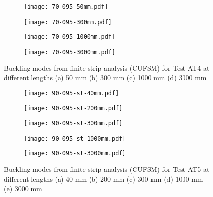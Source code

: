 \begin{figure}
	\centering
	\begin{subfigure}[b]{0.15\textwidth}
		\centering
		\texttt{[image: 70-095-50mm.pdf]}
		\caption{}
		\label{subfig:70-095-50mm}
	\end{subfigure}
	\begin{subfigure}[b]{0.15\textwidth}
		\centering
		\texttt{[image: 70-095-300mm.pdf]}
		\caption{}
		\label{subfig:70-095-300mm}
	\end{subfigure}
	\begin{subfigure}[b]{0.18\textwidth}
		\centering
		\texttt{[image: 70-095-1000mm.pdf]}
		\caption{}
		\label{subfig:70-095-1000mm}
	\end{subfigure}
	\begin{subfigure}[b]{0.18\textwidth}
		\centering
		\texttt{[image: 70-095-3000mm.pdf]}
		\caption{}
		\label{subfig:70-095-3000mm}
	\end{subfigure}
		\caption{Buckling modes from finite strip analysis (CUFSM) for Test-AT4 at different lengths (a) 50 mm (b) 300 mm (c) 1000 mm (d) 3000 mm}
		\label{fig:70-095-CUFSM-buckling}
\end{figure}
\begin{figure}
	\centering
	\begin{subfigure}[b]{0.15\textwidth}
		\centering
		\texttt{[image: 90-095-st-40mm.pdf]}
		\caption{}
		\label{subfig:90-095-st-40mm}
	\end{subfigure}
	\begin{subfigure}[b]{0.15\textwidth}
		\centering
		\texttt{[image: 90-095-st-200mm.pdf]}
		\caption{}
		\label{subfig:90-095-st-200mm}
	\end{subfigure}
	\begin{subfigure}[b]{0.15\textwidth}
		\centering
		\texttt{[image: 90-095-st-300mm.pdf]}
		\caption{}
		\label{subfig:90-095-st-300mm}
	\end{subfigure}
	\begin{subfigure}[b]{0.15\textwidth}
		\centering
		\texttt{[image: 90-095-st-1000mm.pdf]}
		\caption{}
		\label{subfig:90-095-st-1000mm}
	\end{subfigure}
	\begin{subfigure}[b]{0.15\textwidth}
		\centering
		\texttt{[image: 90-095-st-3000mm.pdf]}
		\caption{}
		\label{subfig:90-095-st-3000mm}
	\end{subfigure}
		\caption{Buckling modes from finite strip analysis (CUFSM) for Test-AT5 at different lengths (a) 40 mm (b) 200 mm (c) 300 mm (d) 1000 mm (e) 3000 mm}
		\label{fig:90-095-st-CUFSM-buckling}
\end{figure}

